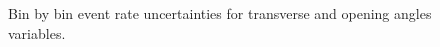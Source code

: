 \documentclass{article}
\begin{document}
\begin{figure}
    \caption{Bin by bin event rate uncertainties for transverse and opening angles variables.}
    \label{fig:bin-uncertainties-rates-opening-angles-transverse}
\end{figure}
\end{document}
